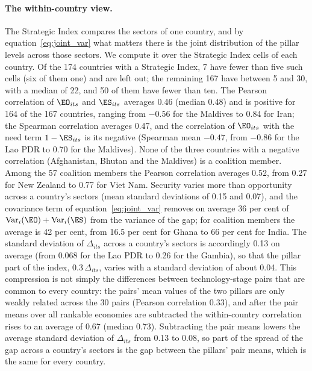 \paragraph{The within-country view.} The Strategic Index compares the sectors of one country, and
by equation~\eqref{eq:joint_var} what matters there is the joint distribution of the pillar
levels across those sectors. We compute it over the Strategic Index cells of each country. Of the
174 countries with a Strategic Index, 7 have fewer than five such cells (six of them one) and
are left out; the remaining 167 have between 5 and 30, with a median of 22, and 50 of them have
fewer than ten. The Pearson correlation of $\EO_{its}$ and $\ES_{its}$ averages 0.46 (median
0.48) and is positive for 164 of the 167 countries, ranging from $-0.56$ for the Maldives to 0.84
for Iran; the Spearman correlation averages 0.47, and the correlation of $\EO_{its}$ with the need
term $1-\ES_{its}$ is its negative (Spearman mean $-0.47$, from $-0.86$ for the Lao PDR to 0.70
for the Maldives). None of the three countries with a negative correlation (Afghanistan, Bhutan
and the Maldives) is a coalition member. Among the 57 coalition members the Pearson correlation
averages 0.52, from 0.27 for New Zealand to 0.77 for Viet Nam. Security varies more than
opportunity across a country's sectors (mean standard deviations of 0.15 and 0.07), and the
covariance term of equation~\eqref{eq:joint_var} removes on average 36 per cent of
$\operatorname{Var}_i(\EO)+\operatorname{Var}_i(\ES)$ from the variance of the gap; for coalition
members the average is 42 per cent, from 16.5 per cent for Ghana to 66 per cent for India. The
standard deviation of $\Delta_{its}$ across a country's sectors is accordingly 0.13 on average
(from 0.068 for the Lao PDR to 0.26 for the Gambia), so that the pillar part of the index,
$0.3\,\Delta_{its}$, varies with a standard deviation of about 0.04. This compression is not
simply the differences between technology-stage pairs that are common to every country: the
pairs' mean values of the two pillars are only weakly related across the 30 pairs (Pearson
correlation 0.33), and after the pair means over all rankable economies are subtracted the
within-country correlation rises to an average of 0.67 (median 0.73). Subtracting the pair means
lowers the average standard deviation of $\Delta_{its}$ from 0.13 to 0.08, so part of the spread
of the gap across a country's sectors is the gap between the pillars' pair means, which is the
same for every country.

